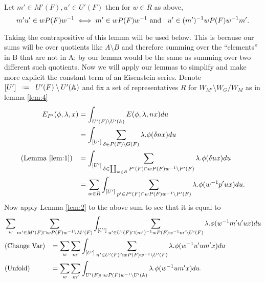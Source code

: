     \begin{Lemma}\label{lem:2}
        Let \(m'\in M'(F),  u'\in U'(F)\) then for \(w\in R\) as above,
        \[m'u' \in wP(F)w^{-1} \iff m'\in wP(F)w^{-1} \text{ and  }\;\; u'\in (m')^{-1} wP(F)w^{-1} m'.\]
    \end{Lemma}
    Taking the contrapositive of this lemma will be used below. This is because our sums will be over quotients like \(A\setminus B\) and therefore summing over the ``elements'' in B that are not in A; by our lemma would be the same as summing over two different such quotients.
Now we will apply our lemmas to simplify and make more explicit the constant term of an Eisenstein series. Denote \([U']\defeq U'(F)\setminus U'(\A)\) and fix a set of representatives \(R\) for \( W_{M'}\setminus W_G / W_{M}\) as in lemma \ref{lem:4}
    \begin{equation*}
        \begin{aligned}
            E_{P'}( \phi, \lambda, x) &= \int_{U'(F)\setminus U'(\A)} E( \phi, \lambda, nx) du\\
                                     &= \int_{[U']} \sum_{\delta\in P(F)\setminus G(F)} \lambda.\phi(\delta nx)  du\\
                                    (\text{Lemma }\ref{lem:1}) \;\;\; &= \int_{[U']} \sum_{\delta\in \coprod_{w\in R} P'(F)\cap wP(F)w\inv \setminus P'(F)} \lambda.\phi(\delta ux)  du\\
                                     &= \sum_{ w\in R}\int_{[U']} \sum_{p'\in P'(F)\cap wP(F)w\inv \setminus P'(F)} \lambda.\phi( w\inv p'ux)  du.\\
        \end{aligned}
    \end{equation*}
    Now apply Lemma \ref{lem:2} to the above sum to see that it is equal to 
    \begin{align*}
    	&\sum_{ w} \sum_{m'\in M'(F)\cap wP(F)w\inv\setminus M'(F)} \int_{[U']} \sum_{u'\in U'(F)\cap (m')\inv wP(F)w\inv m' \setminus U'(F)} \lambda.\phi( w\inv m'u'ux)  du\\
    	&(\text{Change Var}) \;\;\; = \sum_{ w} \sum_{m'} \int_{[U']} \sum_{n'\in U'(F)\cap wP(F)w\inv\setminus U'(F) } \lambda.\phi( w\inv u'um'x)  du\\
    	&(\text{Unfold}) \;\;\;\;\;\;\;\;\;\;\; = \sum_{ w} \sum_{m'} \int_{U'(F)\cap wP(F)w\inv \setminus U'(\A)} \lambda.\phi( w\inv um' x)  du.\\
    \end{align*}

